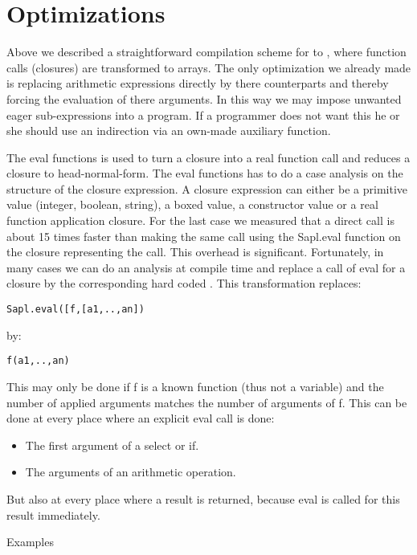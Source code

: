 \section{Optimizations}\label{sapljs:sec:optimizations}
Above we described a straightforward compilation scheme for \Sapl to \JS, where function calls (closures) are transformed to arrays.
The only optimization we already made is replacing arithmetic expressions directly by there \JS counterparts 
and thereby forcing the evaluation of there arguments. 
In this way we may impose unwanted eager sub-expressions into a program. 
If a programmer does not want this he or she should use an indirection via an own-made auxiliary function.

The \textsf{eval} functions is used to turn a closure into a real \JS function call and reduces a closure to head-normal-form.
The \textsf{eval} functions has to do a case analysis on the structure of the closure expression.
A closure expression can either be a primitive value (integer, boolean, string), a boxed value, a constructor value or a real function application closure.
For the last case we measured that a direct \JS call is about 15 times faster than making the same call using the 
\textsf{Sapl.eval} function on the closure representing the call. This overhead is significant. 
Fortunately, in many cases we can do an analysis at compile time and replace a call of \textsf{eval} for a closure by the corresponding hard coded \JS.
This transformation replaces:
\begin{verbatim}
Sapl.eval([f,[a1,..,an])
\end{verbatim}
by:
\begin{verbatim}
f(a1,..,an)
\end{verbatim}
This may only be done if \textsf{f} is a known function (thus not a variable) and the number of applied arguments matches the
number of arguments of \textsf{f}.
This can be done at every place where an explicit \textsf{eval} call is done:
\begin{itemize}
\item The first argument of a \textsf{select} or \textsf{if}.
\item The arguments of an arithmetic operation.
\end{itemize}
But also at every place where a result is returned, because \textsf{eval} is called for this result immediately.


Examples

 

